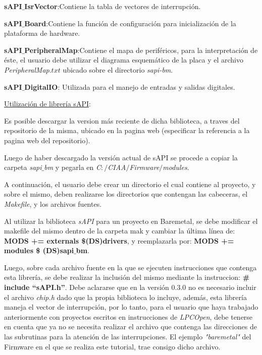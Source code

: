 \documentclass[12pt,letterpaper]{article}
\begin{document}
\textbf{sAPI$\_$IsrVector}:Contiene la tabla de vectores de interrupción.

\textbf{sAPI$\_$Board}:Contiene la función de configuración para inicialización de la plataforma de hardware.

\textbf{sAPI$\_$PeripheralMap}:Contiene el mapa de periféricos, para la interpretación de éste, el usuario debe utilizar el diagrama esquemático de la placa y el archivo \textit{PeripheralMap$.txt$} ubicado sobre el directorio \textit{sapi-bm}.

\textbf{sAPI$\_$DigitalIO}: Utilizada para el manejo de entradas y salidas digitales.

\underline{Utilización de librería sAPI}:

Es posible descargar la version más reciente de dicha biblioteca, a traves del repositorio de la misma, ubicado en la pagina web (especificar la referencia a la pagina web del repositorio).

Luego de haber descargado la versión actual de  sAPI se procede a copiar la carpeta \textit{sapi$\_$bm} y pegarla en \textit{C$:/$CIAA$/$Firmware$/$modules}.

A continuación, el usuario debe crear un directorio el cual contiene al proyecto, y sobre el mismo, deben realizarse los directorios que contengan las cabeceras, el \textit{Makefile}, y los archivos fuentes.

Al utilizar la biblioteca \textit{sAPI} para un proyecto en Baremetal, se debe modificar el makefile del mismo dentro de la carpeta mak y cambiar la última línea de: \textbf{MODS += externals \$(DS)drivers}, y reemplazarla por:  \textbf{MODS += modules \$ (DS)sapi$\_$bm}.

Luego, sobre cada archivo fuente en la que se ejecuten instrucciones que contenga esta librería, se debe realizar la inclusión del mismo mediante la instruccion: \textbf{\# include “sAPI.h”}. Debe aclararse que en la versión 0.3.0 no es necesario incluir el archivo \textit{chip.h} dado que la propia biblioteca lo incluye, además, esta librería maneja el vector de interrupción, por lo tanto, para el usuario que haya trabajado anteriormente con proyectos escritos en instrucciones de \textit{LPCOpen}, debe tenerse en cuenta que ya no se necesita realizar el archivo que contenga las direcciones de las subrutinas para la atención de las interrupciones. El ejemplo \textit{"baremetal"} del Firmware en el que se realiza este tutorial, trae consigo dicho archivo.
\end{document}
